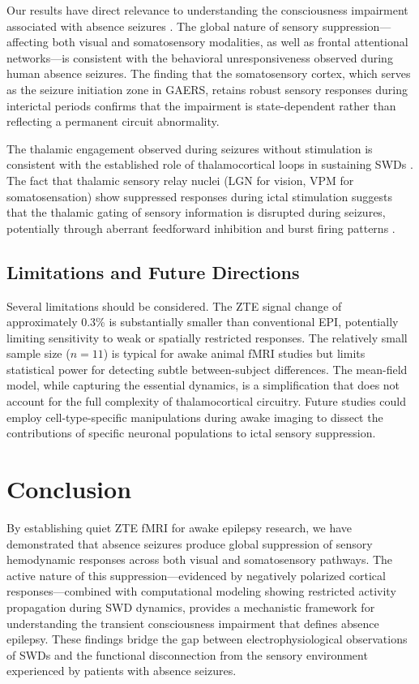 \documentclass[12pt]{article}
\begin{document}
Our results have direct relevance to understanding the consciousness impairment associated with absence seizures \citep{blumenfeld2005consciousness}. The global nature of sensory suppression---affecting both visual and somatosensory modalities, as well as frontal attentional networks---is consistent with the behavioral unresponsiveness observed during human absence seizures. The finding that the somatosensory cortex, which serves as the seizure initiation zone in GAERS, retains robust sensory responses during interictal periods confirms that the impairment is state-dependent rather than reflecting a permanent circuit abnormality.

The thalamic engagement observed during seizures without stimulation is consistent with the established role of thalamocortical loops in sustaining SWDs \citep{meeren2002cortical, polack2007deep}. The fact that thalamic sensory relay nuclei (LGN for vision, VPM for somatosensation) show suppressed responses during ictal stimulation suggests that the thalamic gating of sensory information is disrupted during seizures, potentially through aberrant feedforward inhibition and burst firing patterns \citep{bai2010default}.

\subsection{Limitations and Future Directions}

Several limitations should be considered. The ZTE signal change of approximately 0.3\% is substantially smaller than conventional EPI, potentially limiting sensitivity to weak or spatially restricted responses. The relatively small sample size ($n = 11$) is typical for awake animal fMRI studies but limits statistical power for detecting subtle between-subject differences. The mean-field model, while capturing the essential dynamics, is a simplification that does not account for the full complexity of thalamocortical circuitry. Future studies could employ cell-type-specific manipulations during awake imaging to dissect the contributions of specific neuronal populations to ictal sensory suppression.

\section{Conclusion}

By establishing quiet ZTE fMRI for awake epilepsy research, we have demonstrated that absence seizures produce global suppression of sensory hemodynamic responses across both visual and somatosensory pathways. The active nature of this suppression---evidenced by negatively polarized cortical responses---combined with computational modeling showing restricted activity propagation during SWD dynamics, provides a mechanistic framework for understanding the transient consciousness impairment that defines absence epilepsy. These findings bridge the gap between electrophysiological observations of SWDs and the functional disconnection from the sensory environment experienced by patients with absence seizures.



\end{document}
